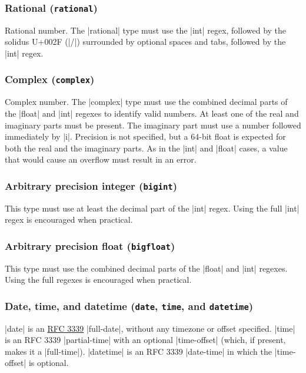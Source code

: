 \documentclass[11pt]{article}
\begin{document}
\subsubsection{Rational (\texttt{rational})}

Rational number.  The |rational| type must use the |int| regex, followed by the solidus U+002F (|/|) surrounded by optional spaces and tabs, followed by the |int| regex.


\subsubsection{Complex (\texttt{complex})}

Complex number.  The |complex| type must use the combined decimal parts of the |float| and |int| regexes to identify valid numbers.  At least one of the real and imaginary parts must be present.  The imaginary part must use a number followed immediately by |i|.  Precision is not specified, but a 64-bit float is expected for both the real and the imaginary parts.  As in the |int| and |float| cases, a value that would cause an overflow must result in an error.


\subsubsection{Arbitrary precision integer (\texttt{bigint})}

This type must use at least the decimal part of the |int| regex.  Using the full |int| regex is encouraged when practical.


\subsubsection{Arbitrary precision float (\texttt{bigfloat})}

This type must use the combined decimal parts of the |float| and |int| regexes.  Using the full regexes is encouraged when practical.


\subsubsection{Date, time, and datetime (\texttt{date}, \texttt{time}, and \texttt{datetime})}

|date| is an \href{http://tools.ietf.org/html/rfc3339}{RFC 3339} |full-date|, without any timezone or offset specified.  |time| is an RFC 3339 |partial-time| with an optional |time-offset| (which, if present, makes it a |full-time|).  |datetime| is an RFC 3339 |date-time| in which the |time-offset| is optional.
\end{document}
